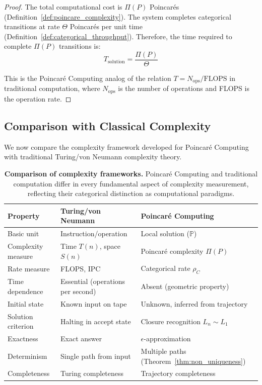 \begin{proof}
The total computational cost is $\Pi(P)$ Poincarés (Definition~\ref{def:poincare_complexity}). The system completes categorical transitions at rate $\Theta$ Poincarés per unit time (Definition~\ref{def:categorical_throughput}). Therefore, the time required to complete $\Pi(P)$ transitions is:
\begin{equation}
T_{\text{solution}} = \frac{\Pi(P)}{\Theta}
\end{equation}

This is the Poincaré Computing analog of the relation $T = N_{\text{ops}} / \text{FLOPS}$ in traditional computation, where $N_{\text{ops}}$ is the number of operations and FLOPS is the operation rate.
\end{proof}

\subsection{Comparison with Classical Complexity}

We now compare the complexity framework developed for Poincaré Computing with traditional Turing/von Neumann complexity theory.

\begin{table}[ht]
\centering
\begin{tabular}{lll}
\toprule
\textbf{Property} & \textbf{Turing/von Neumann} & \textbf{Poincaré Computing} \\
\midrule
Basic unit & Instruction/operation & Local solution ($\mathbb{P}$) \\
Complexity measure & Time $T(n)$, space $S(n)$ & Poincaré complexity $\Pi(P)$ \\
Rate measure & FLOPS, IPC & Categorical rate $\rho_C$ \\
Time dependence & Essential (operations per second) & Absent (geometric property) \\
Initial state & Known input on tape & Unknown, inferred from trajectory \\
Solution criterion & Halting in accept state & Closure recognition $L_n \sim L_1$ \\
Exactness & Exact answer & $\epsilon$-approximation \\
Determinism & Single path from input & Multiple paths (Theorem~\ref{thm:non_uniqueness}) \\
Completeness & Turing completeness & Trajectory completeness \\
\bottomrule
\end{tabular}
\caption{\textbf{Comparison of complexity frameworks.} Poincaré Computing and traditional computation differ in every fundamental aspect of complexity measurement, reflecting their categorical distinction as computational paradigms.}
\label{tab:complexity_comparison}
\end{table}

